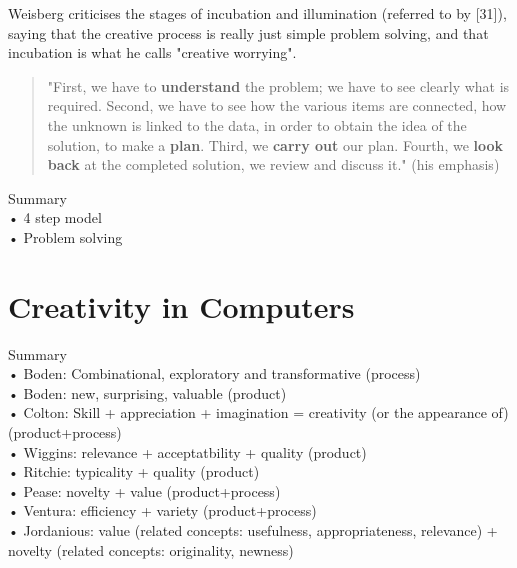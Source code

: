 Weisberg criticises the stages of incubation and illumination (referred to by [31]), saying that the creative process is really just simple problem solving, and that incubation is what he calls "creative worrying".

\begin{quote}
"First, we have to \textbf{understand} the problem; we have to see clearly what is required. Second, we have to see how the various items are connected, how the unknown is linked to the data, in order to obtain the idea of the solution, to make a \textbf{plan}. Third, we \textbf{carry out} our plan. Fourth, we \textbf{look back} at the completed solution, we review and discuss it." \citep[p.5-6]{Polya1957}(his emphasis)
\end{quote}

\begin{shaded}
Summary\\
•	4 step model\\
•	Problem solving
\end{shaded}


\section{Creativity in Computers}

\begin{shaded}
Summary\\
•	Boden: Combinational, exploratory and transformative \citep{Boden2003, Wiggins2006} (process)\\
•	Boden: new, surprising, valuable \citep{Boden2003} (product)\\
•	Colton: Skill + appreciation + imagination = creativity (or the appearance of) \citep{Colton2008a} (product+process)\\
•	Wiggins: relevance + acceptatbility + quality \citep{Wiggins2006} (product)\\
•	Ritchie: typicality + quality \citep{Ritchie2001, Ritchie2007} (product)\\
•	Pease: novelty + value \citep{Pease2001} (product+process)\\
•	Ventura: efficiency + variety \citep{Ventura2008} (product+process)\\
•	Jordanious: value (related concepts: usefulness, appropriateness, relevance) + novelty (related concepts: originality, newness) \citep{Jordanous2012}
\end{shaded}

